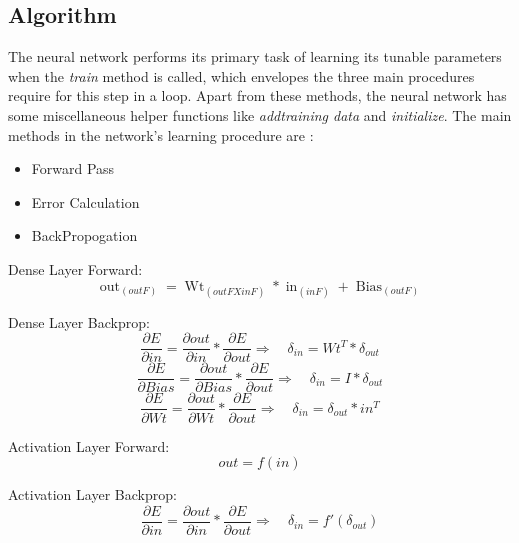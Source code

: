 \documentclass[conference]{IEEEtran}
\begin{document}
\subsection{Algorithm}
The neural network performs its primary task of learning its tunable parameters when the \textit{train} method is called, which envelopes the three main procedures require for this step in a loop. Apart from these methods, the neural network has some miscellaneous helper functions like \textit{add\textunderscore training \textunderscore data} and \textit{initialize}. The main methods in the network's learning procedure are :
\begin{itemize}
    \item Forward Pass
    \item Error Calculation
    \item BackPropogation
\end{itemize}

Dense Layer Forward:
\begin{equation}
\mathop{out}_{(outF)} = \mathop{Wt}_{(outF X inF)}*\mathop{in}_{(inF)} + \mathop{Bias}_{(outF)}
\end{equation}

Dense Layer Backprop:
\begin{equation}
\frac{\partial E}{\partial in} = \frac{\partial out}{\partial in}*\frac{\partial E}{\partial out} \Rightarrow\quad \delta_{in} = Wt^{T}*\delta_{out}
\end{equation}
\begin{equation}
\frac{\partial E}{\partial Bias} = \frac{\partial out}{\partial Bias}*\frac{\partial E}{\partial out} \Rightarrow\quad \delta_{in} = I*\delta_{out} 
\end{equation}
\begin{equation}
\frac{\partial E}{\partial Wt} = \frac{\partial out}{\partial Wt}*\frac{\partial E}{\partial out} \Rightarrow\quad \delta_{in} = \delta_{out}*in^{T} 
\end{equation}

Activation Layer Forward:
\begin{equation}
out = f(in)
\end{equation}

Activation Layer Backprop:
\begin{equation}
\frac{\partial E}{\partial in} = \frac{\partial out}{\partial in}*\frac{\partial E}{\partial out} \Rightarrow\quad \delta_{in} = f'(\delta_{out})
\end{equation}
\end{document}
